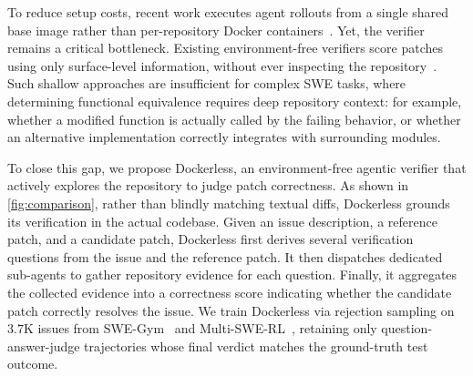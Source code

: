 \documentclass[]{arxiv_template}
\newcommand{\approach}{Dockerless\xspace}
\begin{document}
To reduce setup costs, recent work executes agent rollouts from a single shared base image rather than per-repository Docker containers~\citep{sun2026swe,ludwig2026swe,xu2025scalable}.
Yet, the verifier remains a critical bottleneck.
Existing environment-free verifiers score patches using only surface-level information, without ever inspecting the repository~\citep{shum2025swe,wang2026rubric,luo2025deepswe}.
Such shallow approaches are insufficient for complex SWE tasks, where determining functional equivalence requires deep repository context: for example, whether a modified function is actually called by the failing behavior, or whether an alternative implementation correctly integrates with surrounding modules.

To close this gap, we propose \approach, an environment-free agentic verifier that actively explores the repository to judge patch correctness. As shown in \cref{fig:comparison}, rather than blindly matching textual diffs, \approach grounds its verification in the actual codebase. 
Given an issue description, a reference patch, and a candidate patch, \approach first derives several verification questions from the issue and the reference patch. It then dispatches dedicated sub-agents to gather repository evidence for each question.
Finally, it aggregates the collected evidence into a correctness score indicating whether the candidate patch correctly resolves the issue.
We train \approach via rejection sampling on $3.7$K issues from SWE-Gym~\citep{pan2025training} and Multi-SWE-RL~\citep{zan2026multi}, retaining only question-answer-judge trajectories whose final verdict matches the ground-truth test outcome.
\end{document}
